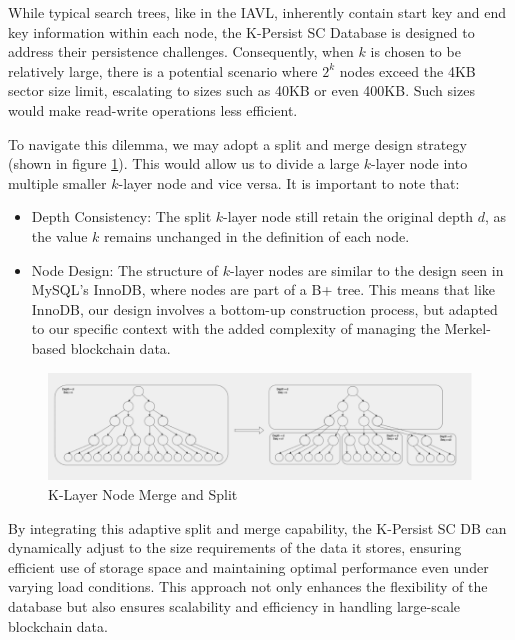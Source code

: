 While typical search trees, like in the IAVL, inherently contain start key and end key information within each node, the K-Persist SC Database is designed to address their persistence challenges. Consequently, when $k$ is chosen to be relatively large, there is a potential scenario where $2^k$ nodes exceed the 4KB sector size limit, escalating to sizes such as 40KB or even 400KB. Such sizes would make read-write operations less efficient.

To navigate this dilemma, we may adopt a split and merge design strategy (shown in figure \ref{fig:k_layer_node_merge_split}). This would allow us to divide a large $k$-layer node into multiple smaller $k$-layer node and vice versa. It is important to note that:

\begin{itemize}
    \item Depth Consistency: The split $k$-layer node still retain the original depth $d$, as the value $k$ remains unchanged in the definition of each node.
    \item Node Design: The structure of $k$-layer nodes are similar to the design seen in MySQL's InnoDB, where nodes are part of a B+ tree. This means that like InnoDB, our design involves a bottom-up construction process, but adapted to our specific context with the added complexity of managing the Merkel-based blockchain data.
\end{itemize}

\begin{figure}[htp]
  \centering
  \includegraphics[width=\textwidth]{sections/images/k-persist-layer-merge-split.png}
  \caption{K-Layer Node Merge and Split}
  \label{fig:k_layer_node_merge_split}
\end{figure}

By integrating this adaptive split and merge capability, the K-Persist SC DB can dynamically adjust to the size requirements of the data it stores, ensuring efficient use of storage space and maintaining optimal performance even under varying load conditions. This approach not only enhances the flexibility of the database but also ensures scalability and efficiency in handling large-scale blockchain data.
